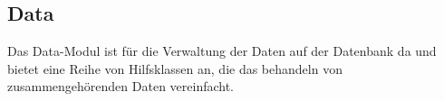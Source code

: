 \subsection{Data} \label{service:modul:Data}
Das Data-Modul ist für die Verwaltung der Daten auf der Datenbank da und bietet eine Reihe von Hilfsklassen an, die das behandeln von zusammengehörenden Daten vereinfacht.